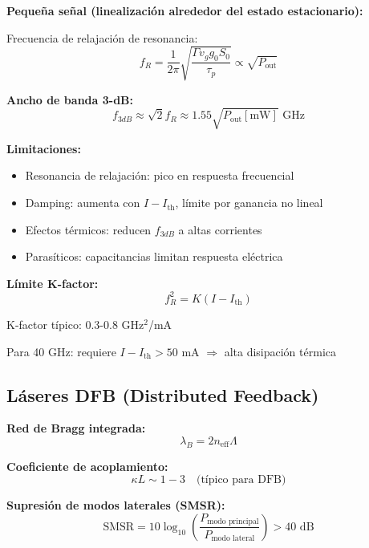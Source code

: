 \documentclass[11pt,a4paper]{article}
\begin{document}
\textbf{Pequeña señal (linealización alrededor del estado estacionario):}

Frecuencia de relajación de resonancia:
\begin{equation}
    f_R = \frac{1}{2\pi}\sqrt{\frac{\Gamma v_g g_0 S_0}{\tau_p}} \propto \sqrt{P_{\text{out}}}
\end{equation}

\textbf{Ancho de banda 3-dB:}
\begin{equation}
    f_{3dB} \approx \sqrt{2} f_R \approx 1.55 \sqrt{P_{\text{out}}[\text{mW}]} \text{ GHz}
\end{equation}

\textbf{Limitaciones:}
\begin{itemize}
    \item Resonancia de relajación: pico en respuesta frecuencial
    \item Damping: aumenta con $I - I_{\text{th}}$, límite por ganancia no lineal
    \item Efectos térmicos: reducen $f_{3dB}$ a altas corrientes
    \item Parasíticos: capacitancias limitan respuesta eléctrica
\end{itemize}

\begin{importante}
\textbf{Límite K-factor:}
\begin{equation}
    f_R^2 = K(I - I_{\text{th}})
\end{equation}

K-factor típico: 0.3-0.8 GHz$^2$/mA

Para 40 GHz: requiere $I - I_{\text{th}} > 50$ mA $\Rightarrow$ alta disipación térmica
\end{importante}

\subsection{Láseres DFB (Distributed Feedback)}

\textbf{Red de Bragg integrada:}
\begin{equation}
    \lambda_B = 2n_{\text{eff}}\Lambda
\end{equation}

\textbf{Coeficiente de acoplamiento:}
\begin{equation}
    \kappa L \sim 1-3 \quad \text{(típico para DFB)}
\end{equation}

\textbf{Supresión de modos laterales (SMSR):}
\begin{equation}
    \text{SMSR} = 10\log_{10}\left(\frac{P_{\text{modo principal}}}{P_{\text{modo lateral}}}\right) > 40 \text{ dB}
\end{equation}
\end{document}
